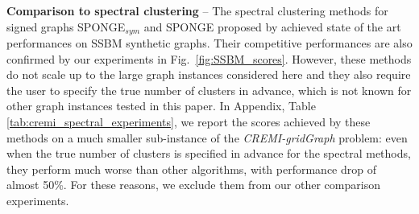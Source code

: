 \textbf{Comparison to spectral clustering} -- 
The spectral clustering methods for signed graphs SPONGE$_{sym}$ and SPONGE proposed by \cite{Cucuringu2019SPONGEAG} achieved state of the art performances on SSBM synthetic graphs. Their competitive performances are also confirmed by our experiments in Fig.~\ref{fig:SSBM_scores}.
However, these methods do not scale up to the large graph instances considered here and they also require the user to specify the true number of clusters in advance, which is not known for other graph instances tested in this paper. In Appendix, Table \ref{tab:cremi_spectral_experiments}, we report the scores achieved by these methods on a much smaller sub-instance of the \emph{CREMI-gridGraph} problem: even when the true number of clusters is specified in advance for the spectral methods, they perform much worse than other \algname{} algorithms, with performance drop of almost 50\%. For these reasons, we exclude them from our other comparison experiments.  

